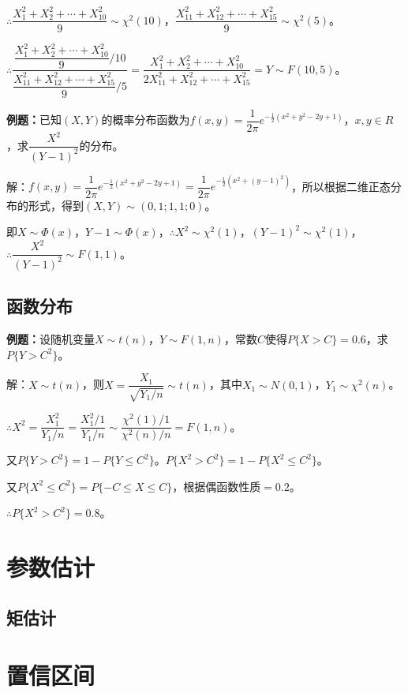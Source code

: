 \documentclass[UTF8, 12pt]{ctexart}
\begin{document}
$\therefore\dfrac{X_1^2+X_2^2+\cdots+X_{10}^2}{9}\sim\chi^2(10)$，$\dfrac{X_{11}^2+X_{12}^2+\cdots+X_{15}^2}{9}\sim\chi^2(5)$。

$\therefore\dfrac{\dfrac{X_1^2+X_2^2+\cdots+X_{10}^2}{9}/10}{\dfrac{X_{11}^2+X_{12}^2+\cdots+X_{15}^2}{9}/5}=\dfrac{X_1^2+X_2^2+\cdots+X_{10}^2}{2X_{11}^2+X_{12}^2+\cdots+X_{15}^2}=Y\sim F(10,5)$。

\textbf{例题：}已知$(X,Y)$的概率分布函数为$f(x,y)=\dfrac{1}{2\pi}e^{-\frac{1}{2}(x^2+y^2-2y+1)}$，$x,y\in R$，求$\dfrac{X^2}{(Y-1)^2}$的分布。

解：$f(x,y)=\dfrac{1}{2\pi}e^{-\frac{1}{2}(x^2+y^2-2y+1)}=\dfrac{1}{2\pi}e^{-\frac{1}{2}(x^2+(y-1)^2)}$，所以根据二维正态分布的形式，得到$(X,Y)\sim(0,1;1,1;0)$。

即$X\sim\varPhi(x)$，$Y-1\sim\varPhi(x)$，$\therefore X^2\sim\chi^2(1)$，$(Y-1)^2\sim\chi^2(1)$，$\therefore\dfrac{X^2}{(Y-1)^2}\sim F(1,1)$。

\subsection{函数分布}

\textbf{例题：}设随机变量$X\sim t(n)$，$Y\sim F(1,n)$，常数$C$使得$P\{X>C\}=0.6$，求$P\{Y>C^2\}$。

解：$X\sim t(n)$，则$X=\dfrac{X_1}{\sqrt{Y_1/n}}\sim t(n)$，其中$X_1\sim N(0,1)$，$Y_1\sim\chi^2(n)$。

$\therefore X^2=\dfrac{X_1^2}{Y_1/n}=\dfrac{X_1^2/1}{Y_1/n}\sim\dfrac{\chi^2(1)/1}{\chi^2(n)/n}=F(1,n)$。

又$P\{Y>C^2\}=1-P\{Y\leqslant C^2\}$。$P\{X^2>C^2\}=1-P\{X^2\leqslant C^2\}$。

又$P\{X^2\leqslant C^2\}=P\{-C\leqslant X\leqslant C\}$，根据偶函数性质$=0.2$。

$\therefore P\{X^2>C^2\}=0.8$。

\section{参数估计}

\subsection{矩估计}

\section{置信区间}
\end{document}
